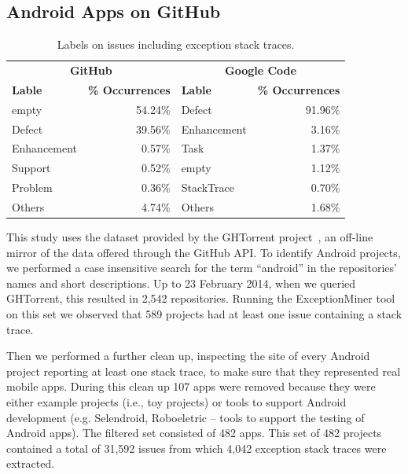 

\subsection{Android Apps on GitHub}
\label{sec:git}


\begin{table}
  \scriptsize
  \centering
  \begin{tabular}{lr|lr}
    \hline
     \multicolumn{2}{c}{\bfseries{GitHub}} &  \multicolumn{2}{c}{\bfseries{Google Code}} \\
      \bfseries{Lable} &  \bfseries{\% Occurrences} &  \bfseries{Lable} &  \bfseries{\% Occurrences} \\
    \hline
empty &	54.24\% & Defect &	91.96\% \\
Defect &	39.56\%  & Enhancement  &	3.16\% \\
Enhancement &	0.57\% & Task	& 1.37\% \\
Support &	0.52\% & empty &	1.12\% \\
Problem &	0.36\% & StackTrace &	0.70\% \\
Others &	4.74\% &  Others &	1.68\% \\   
  \hline
  \end{tabular}
  \caption{Labels on issues including exception stack traces.}
  \label{tab:lables}
\end{table}


This study uses the dataset provided by the GHTorrent project~\cite{Gousi13}, 
an off-line mirror of the data  offered through the GitHub API.  
To identify Android projects, we performed a case insensitive search for the
term ``android'' in the repositories' names and short descriptions.  
Up to 23 February 2014,  when we queried GHTorrent, this resulted in 2,542 repositories. Running the ExceptionMiner tool 
 on this set we observed that 589 projects had at least one issue containing a stack trace.
	
Then we performed a further clean up, inspecting the site of every Android project
reporting at least one stack trace, to make sure that they represented real
mobile apps. During this clean up 107 apps were removed because they were either
example projects (i.e., toy projects) or tools to support Android development
(e.g. Selendroid, Roboeletric -- tools to support the testing of Android apps).
The filtered set consisted of 482 apps. This set of 482 projects contained a total of 31,592 issues from which 4,042 exception stack traces 
were extracted. 

